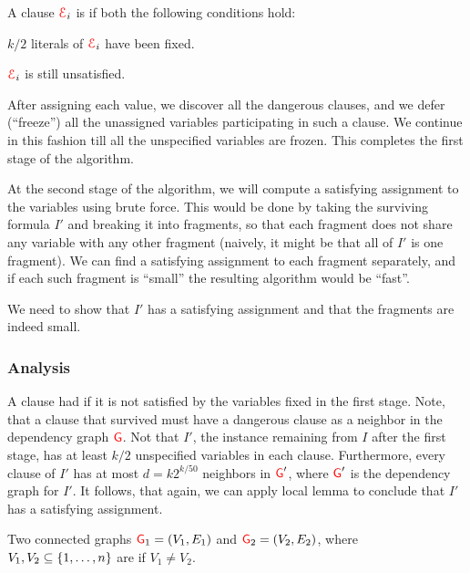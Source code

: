 \begin{defn}
    A clause ${\textcolor{red}{\EuScript{E}}}_i$ is  if  both the
    following conditions hold:
    \begin{compactenumi}
        \item $k/2$ literals of ${\textcolor{red}{\EuScript{E}}}_i$ have been fixed.
        
        \item ${\textcolor{red}{\EuScript{E}}}_i$ is still unsatisfied. 
    \end{compactenumi}
\end{defn}

After assigning each value, we discover all the dangerous clauses, and
we defer (``freeze'') all the unassigned variables participating in
such a clause.  We continue in this fashion till all the unspecified
variables are frozen. This completes the first stage of the
algorithm. 

At the second stage of the algorithm, we will compute a satisfying
assignment to the variables using brute force. This would be done by
taking the surviving formula $I'$ and breaking it into fragments, so
that each fragment does not share any variable with any other fragment
(naively, it might be that all of $I'$ is one fragment). We can find a
satisfying assignment to each fragment separately, and if each such
fragment is ``small'' the resulting algorithm would be ``fast''.

We need to show that $I'$ has a satisfying assignment and that the
fragments are indeed small.


\subsubsection{Analysis}

A clause had  if it is not satisfied
by the variables fixed in the first stage.  Note, that a clause that
survived must have a dangerous clause as a neighbor in the dependency
graph ${\textcolor{red}{\mathsf{G}}}$.  Not that $I'$, the instance remaining from $I$ after
the first stage, has at least $k/2$ unspecified variables in each
clause. Furthermore, every clause of $I'$ has at most $d=k2^{k/50}$
neighbors in ${\textcolor{red}{\mathsf{G}}}'$, where ${\textcolor{red}{\mathsf{G}}}'$ is the dependency graph for $I'$. It
follows, that again, we can apply \Lovasz{} local lemma to conclude
that $I'$ has a satisfying assignment.

\begin{defn}
    Two connected graphs ${\textcolor{red}{\mathsf{G}}}_1=(V_1, E_1)$ and ${\textcolor{red}{\mathsf{G}}}_2=(V_2,
    E_2)$, where $V_1, V_2 \subseteq \left\{ {1,\ldots, n} \right\}$ are
     if $V_1 \ne V_2$. 
\end{defn}

